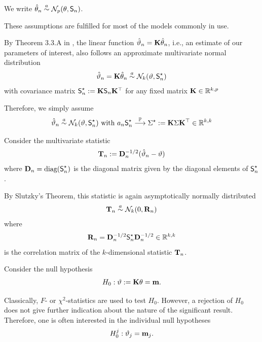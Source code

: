 \documentclass[landscape]{slides}
\begin{document}
We write $\hat{\theta}_n \stackrel{a}{\sim} \mathcal{N}_p(\theta, \textsf{S}_n)$.

These assumptions are fulfilled for most of the models commonly in use.


By Theorem 3.3.A in
\cite{Serfling1980}, the linear function $\hat{\vartheta}_n = \mathbf{K} 
\hat{\theta}_n$, i.e., an estimate of our parameters of interest,
also follows an approximate multivariate normal
distribution
\begin{eqnarray*}
\hat{\vartheta}_n = \mathbf{K} \hat{\theta}_n \stackrel{a}{\sim} \mathcal{N}_k(\vartheta, \textsf{S}^\star_n)
\end{eqnarray*}
with covariance matrix $\textsf{S}^\star_n := \mathbf{K} \textsf{S}_n \mathbf{K}^\top$
for any fixed matrix $\mathbf{K} \in \mathbb{R}^{k,p}$

Therefore, we simply assume
\begin{eqnarray*}
\hat{\vartheta}_n \stackrel{a}{\sim} \mathcal{N}_k(\vartheta, \textsf{S}^\star_n) \text{ with }
a_n \textsf{S}^\star_n \stackrel{\mathbb{P}}{\longrightarrow} \Sigma^\star := \mathbf{K} \Sigma \mathbf{K}^\top \in \mathbb{R}^{k,k}
\end{eqnarray*}


Consider the multivariate statistic
\begin{eqnarray*}
\T_n := %
\D_n^{-1/2} (\hat{\vartheta}_n - \vartheta) 
\end{eqnarray*}
where $\mathbf{D}_n = \text{diag}(\textsf{S}^\star_n)$ is the diagonal matrix given by the diagonal elements of
$\textsf{S}^\star_n$.

By Slutzky's Theorem, this statistic is again asymptotically normally
distributed
\begin{eqnarray*}
\mathbf{T}_n \stackrel{a}{\sim} \mathcal{N}_k(0, \mathbf{R}_n)
\end{eqnarray*}
where
\begin{eqnarray*}
\mathbf{R}_n = \mathbf{D}_n^{-1/2} \textsf{S}^\star_n \mathbf{D}_n^{-1/2} \in \mathbb{R}^{k,k}
\end{eqnarray*}
is the correlation matrix of the $k$-dimensional statistic $\mathbf{T}_n$. 



Consider the null hypothesis
\begin{eqnarray*}
H_0: \vartheta := \mathbf{K} \theta = \mathbf{m}.
\end{eqnarray*}

Classically, $F$- or $\chi^2$-statistics are used to test $H_0$.
However, a rejection of $H_0$ 
does not give further indication about the nature of the significant
result. Therefore, one is often interested in the individual null hypotheses
\begin{eqnarray*}
H_0^j: \vartheta_j = \mathbf{m}_j.
\end{eqnarray*}
\end{document}
